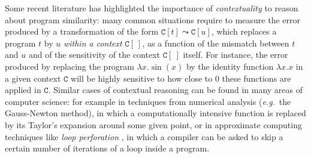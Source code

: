   

 
  
% 
%  
%
%
% 
% 
%  

Some recent literature \cite{chaudhuri, dallago:differential-stlc} has highlighted the importance of \emph{contextuality} to reason about program similarity: many common situations  require to measure the error produced by a transformation of the form $\mathtt C[t] \leadsto \mathtt C[u]$, which replaces a program $t$ by $u$ \emph{within a context} $\mathtt C[\ ]$, as a function of the mismatch between $t$ and $u$ and of the sensitivity of the context $\mathtt C[\ ]$ itself.
%
%
%
%
%
  For instance, the error produced by replacing the program $\lambda x.\sin(x)$ by the identity function $\lambda x.x$
  in a given context  $\mathtt C$ will 
  be highly sensitive to how close to $0$  
  these functions are applied in $\mathtt C$.
 Similar cases of contextual reasoning can be found  in many areas of computer science: for example 
 in techniques from numerical analysis (\emph{e.g.}~the Gauss-Newton method), in which a 
 computationally intensive function is replaced by its Taylor's expansion {around some given point}, or in {approximate computing} techniques like \emph{loop perforation} \cite{loopperf}, in which a compiler can be asked to skip a certain number of iterations of a loop inside a program.%
 

